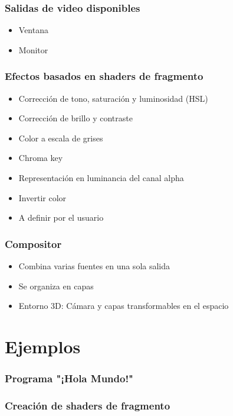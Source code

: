 \documentclass{beamer}
\begin{document}
\begin{frame}[t] \frametitle{Salidas de video disponibles}
	\begin{itemize}
		\item{Ventana}
		\item{Monitor}
	\end{itemize}
\end{frame}

\begin{frame}[t] \frametitle{Efectos basados en shaders de fragmento}
	\begin{itemize}
		\item{Corrección de tono, saturación y luminosidad (HSL)} \pause
		\item{Corrección de brillo y contraste} \pause
		\item{Color a escala de grises} \pause
		\item{Chroma key}  \pause
		\item{Representación en luminancia del canal alpha}  \pause
		\item{Invertir color} \pause
		\item{A definir por el usuario}
	\end{itemize}
\end{frame}

\begin{frame}[t] \frametitle{Compositor}
	\begin{itemize}
		\item{Combina varias fuentes en una sola salida} \pause
		\item{Se organiza en capas}  \pause
		\item{Entorno 3D: Cámara y capas transformables en el espacio}
	\end{itemize}
\end{frame}

%
%
\section{Ejemplos}

\begin{frame}[t, allowframebreaks] \frametitle{Programa "¡Hola Mundo!"}
	
\end{frame}

\begin{frame}[t, allowframebreaks] \frametitle{Creación de shaders de fragmento}
	
	
	
		
\end{frame}
\end{document}
